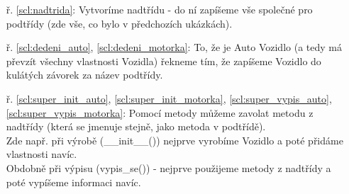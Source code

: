 \begin{minipage}[t]{.45\textwidth}
\vspace{18cm}
\begin{enumerate}
\item[ř. \ref{scl:nadtrida}:] Vytvoríme nadtřídu - do ní zapíšeme vše společné pro podtřídy (zde vše, co bylo v předchozích ukázkách).
\item[ř. \ref{scl:dedeni_auto}, \ref{scl:dedeni_motorka}:] To, že je Auto Vozidlo (a tedy má převzít všechny vlastnosti Vozidla) řekneme tím, že zapíšeme Vozidlo do kulátých závorek za název podtřídy.
\item[ř. \ref{scl:super_init_auto}, \ref{scl:super_init_motorka}, \ref{scl:super_vypis_auto}, \ref{scl:super_vypis_motorka}:] Pomocí metody  můžeme zavolat metodu z nadtřídy (která se jmenuje stejně, jako metoda v podtřídě).\\ Zde např. při výrobě (\_\_init\_\_()) nejprve vyrobíme Vozidlo a poté přidáme vlastnosti navíc.\\
Obdobně při výpisu (vypis\_se()) - nejprve použijeme metody z nadtřídy a poté vypíšeme informaci navíc. 
\end{enumerate}
\end{minipage}
